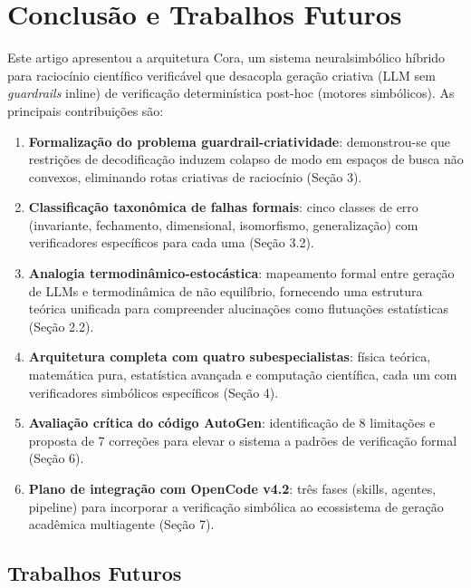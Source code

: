 \documentclass[5p]{elsarticle}
\theoremstyle{remark}
\begin{document}
\section{Conclusão e Trabalhos Futuros}

Este artigo apresentou a arquitetura Cora, um sistema neuralsimbólico híbrido para raciocínio científico verificável que desacopla geração criativa (LLM sem \textit{guardrails} inline) de verificação determinística post-hoc (motores simbólicos). As principais contribuições são:

\begin{enumerate}[label=(\roman*)]
    \item \textbf{Formalização do problema guardrail-criatividade}: demonstrou-se que restrições de decodificação induzem colapso de modo em espaços de busca não convexos, eliminando rotas criativas de raciocínio (Seção 3).
    \item \textbf{Classificação taxonômica de falhas formais}: cinco classes de erro (invariante, fechamento, dimensional, isomorfismo, generalização) com verificadores específicos para cada uma (Seção 3.2).
    \item \textbf{Analogia termodinâmico-estocástica}: mapeamento formal entre geração de LLMs e termodinâmica de não equilíbrio, fornecendo uma estrutura teórica unificada para compreender alucinações como flutuações estatísticas (Seção 2.2).
    \item \textbf{Arquitetura completa com quatro subespecialistas}: física teórica, matemática pura, estatística avançada e computação científica, cada um com verificadores simbólicos específicos (Seção 4).
    \item \textbf{Avaliação crítica do código AutoGen}: identificação de 8 limitações e proposta de 7 correções para elevar o sistema a padrões de verificação formal (Seção 6).
    \item \textbf{Plano de integração com OpenCode v4.2}: três fases (skills, agentes, pipeline) para incorporar a verificação simbólica ao ecossistema de geração acadêmica multiagente (Seção 7).
\end{enumerate}

\subsection{Trabalhos Futuros}
\end{document}
